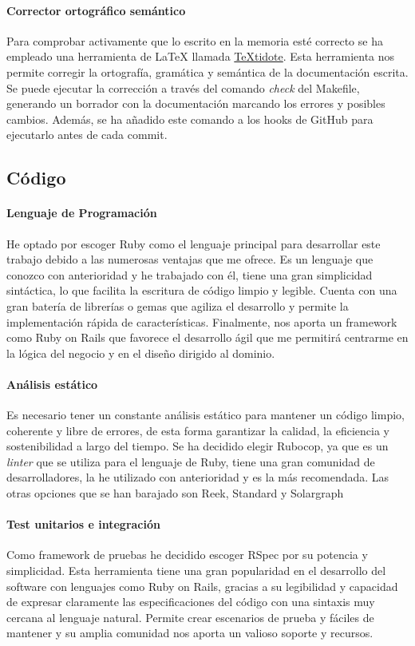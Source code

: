 \paragraph*{Corrector ortográfico semántico}
Para comprobar activamente que lo escrito en la memoria esté correcto se ha empleado una herramienta de LaTeX llamada \href{https://github.com/sylvainhalle/textidote}{TeXtidote}.
Esta herramienta nos permite corregir la ortografía, gramática y semántica de la documentación escrita. Se puede ejecutar la corrección a través del comando \textit{check} del Makefile,
generando un borrador con la documentación marcando los errores y posibles cambios. Además, se ha añadido este comando a los hooks de GitHub para ejecutarlo antes de cada commit.

\subsection{Código}

\paragraph*{Lenguaje de Programación}
He optado por escoger Ruby como el lenguaje principal para desarrollar este trabajo debido a las numerosas ventajas que me ofrece.
Es un lenguaje que conozco con anterioridad y he trabajado con él, tiene una gran simplicidad sintáctica, lo que facilita
la escritura de código limpio y legible. Cuenta con una gran batería de librerías o gemas que agiliza el desarrollo y permite la
implementación rápida de características. Finalmente, nos aporta un framework como Ruby on Rails que favorece el desarrollo ágil que
me permitirá centrarme en la lógica del negocio y en el diseño dirigido al dominio.

\paragraph*{Análisis estático}
Es necesario tener un constante análisis estático para mantener un código limpio, coherente y libre de errores, de esta forma garantizar la calidad, la eficiencia y sostenibilidad a largo
del tiempo. Se ha decidido elegir Rubocop, ya que es un \textit{linter} que se utiliza para el lenguaje de Ruby, tiene una gran comunidad de desarrolladores, la he utilizado con anterioridad
y es la más recomendada. Las otras opciones que se han barajado son Reek, Standard y Solargraph

\paragraph*{Test unitarios e integración}
Como framework de pruebas he decidido escoger RSpec por su potencia y simplicidad. Esta herramienta tiene una gran popularidad en el desarrollo
del software con lenguajes como Ruby on Rails, gracias a su legibilidad y capacidad de expresar claramente las especificaciones del código con una sintaxis
muy cercana al lenguaje natural. Permite crear escenarios de prueba y fáciles de mantener y su amplia comunidad nos aporta un valioso soporte y recursos.


